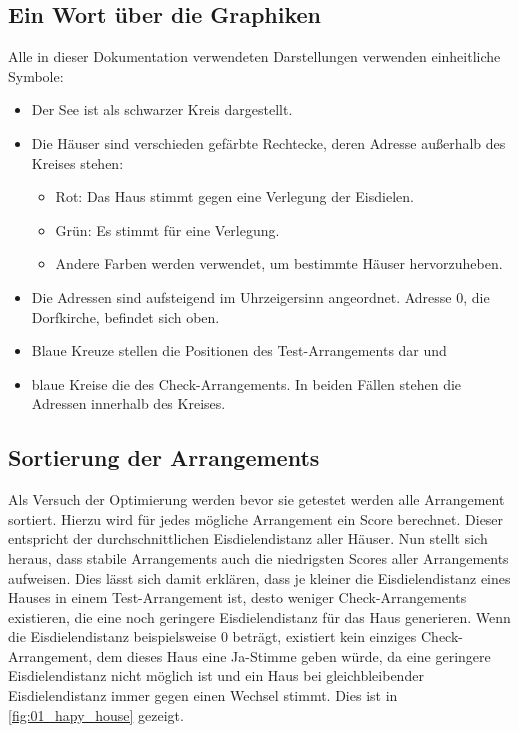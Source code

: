 \documentclass[a4paper,10pt,ngerman,captions=figureheading]{scrartcl}
\begin{document}
\subsection{Ein Wort über die Graphiken}
Alle in dieser Dokumentation verwendeten Darstellungen verwenden einheitliche Symbole:
\begin{itemize}
    \item Der See ist als schwarzer Kreis dargestellt.
    \item Die Häuser sind verschieden gefärbte Rechtecke, deren Adresse außerhalb des Kreises stehen:
          \begin{itemize}
              \item Rot: Das Haus stimmt gegen eine Verlegung der Eisdielen.
              \item Grün: Es stimmt für eine Verlegung.
              \item Andere Farben werden verwendet, um bestimmte Häuser hervorzuheben.
          \end{itemize}
    \item Die Adressen sind aufsteigend im Uhrzeigersinn angeordnet.
          Adresse $0$, die Dorfkirche, befindet sich oben.
    \item Blaue Kreuze stellen die Positionen des Test-Arrangements dar und
    \item blaue Kreise die des Check-Arrangements.
          In beiden Fällen stehen die Adressen innerhalb des Kreises.
\end{itemize}

\subsection{Sortierung der Arrangements}
\label{sec:Sortierung_der_Arrangements}
Als Versuch der Optimierung werden bevor sie getestet werden alle Arrangement sortiert.
Hierzu wird für jedes mögliche Arrangement ein Score berechnet.
Dieser entspricht der durchschnittlichen Eisdielendistanz aller Häuser.
Nun stellt sich heraus, dass stabile Arrangements auch die niedrigsten Scores aller Arrangements aufweisen.
Dies lässt sich damit erklären, dass je kleiner die Eisdielendistanz eines Hauses in einem Test-Arrangement ist, desto weniger Check-Arrangements existieren, die eine noch geringere Eisdielendistanz für das Haus generieren.
Wenn die Eisdielendistanz beispielsweise $0$ beträgt, existiert kein einziges Check-Arrangement, dem dieses Haus eine Ja-Stimme geben würde, da eine geringere Eisdielendistanz nicht möglich ist und ein Haus bei gleichbleibender Eisdielendistanz immer gegen einen Wechsel stimmt.
Dies ist in \autoref{fig:01_hapy_house} gezeigt.
\end{document}
